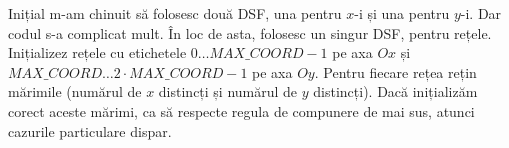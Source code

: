 \documentclass[../main.tex]{subfiles}
\begin{document}
Inițial m-am chinuit să folosesc două DSF, una pentru $x$-i și una pentru $y$-i. Dar codul s-a complicat mult. În loc de asta, folosesc un singur DSF, pentru rețele. Inițializez rețele cu etichetele $0 \dots MAX\_COORD-1$ pe axa $Ox$ și $MAX\_COORD \dots 2 \cdot MAX\_COORD - 1$ pe axa $Oy$. Pentru fiecare rețea rețin mărimile (numărul de $x$ distincți și numărul de $y$ distincți). Dacă inițializăm corect aceste mărimi, ca să respecte regula de compunere de mai sus, atunci cazurile particulare dispar.
\end{document}
